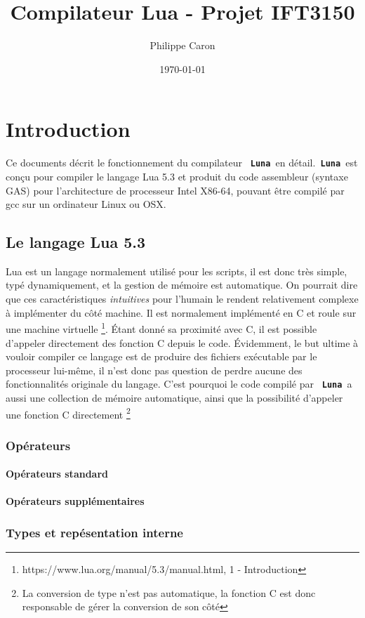\documentclass{article}
\title{Compilateur Lua - Projet IFT3150}
\date{\today}
\author{Philippe Caron}
\newcommand{\luna}{\textbf{\texttt{ Luna }}}
\begin{document}
\maketitle

\newpage
\section{Introduction}
Ce documents décrit le fonctionnement du compilateur \luna en détail.\luna est conçu pour compiler le langage Lua 5.3 et produit du code assembleur (syntaxe GAS) pour l'architecture de processeur Intel X86-64, pouvant être compilé par gcc sur un ordinateur Linux ou OSX.

\subsection{Le langage Lua 5.3}
Lua est un langage normalement utilisé pour les scripts, il est donc très simple, typé dynamiquement, et la gestion de mémoire est automatique. On pourrait dire que ces caractéristiques \textit{intuitives} pour l'humain le rendent relativement complexe à implémenter du côté machine. Il est normalement implémenté en C et roule sur une machine virtuelle \footnote{https://www.lua.org/manual/5.3/manual.html, 1 - Introduction}. Étant donné sa proximité avec C, il est possible d'appeler directement des fonction C depuis le code. Évidemment, le but ultime à vouloir compiler ce langage est de produire des fichiers exécutable par le processeur lui-même, il n'est donc pas question de perdre aucune des fonctionnalités originale du langage. C'est pourquoi le code compilé par \luna a aussi une collection de mémoire automatique, ainsi que la possibilité d'appeler une fonction C directement \footnote{La conversion de type n'est pas automatique, la fonction C est donc responsable de gérer la conversion de son côté}
\subsubsection{Opérateurs}
\paragraph{Opérateurs standard}
\paragraph{Opérateurs supplémentaires}

\subsubsection{Types et repésentation interne}
\setcounter{paragraph}{-1}
\end{document}
